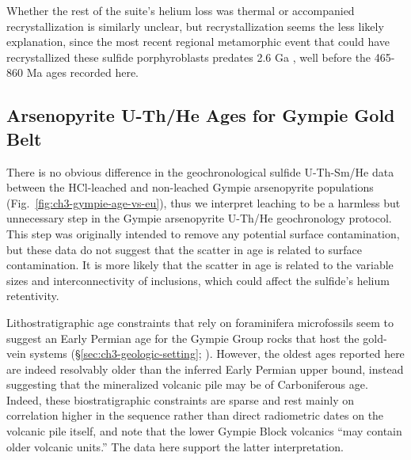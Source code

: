 Whether the rest of the suite's helium loss was
thermal or accompanied recrystallization is similarly unclear, but
recrystallization seems the less likely explanation, since the most
recent regional metamorphic event that could have recrystallized these
sulfide porphyroblasts predates 2.6 Ga \citep{smith1993,hannington1999}, well before the 465-860 Ma ages recorded here.

\subsection{Arsenopyrite U-Th/He Ages for Gympie Gold Belt}

There is no obvious difference in the geochronological sulfide U-Th-Sm/He data between the HCl-leached and non-leached Gympie arsenopyrite populations (Fig.~\ref{fig:ch3-gympie-age-vs-eu}),
thus we interpret leaching to be a harmless but unnecessary step in the Gympie arsenopyrite U-Th/He geochronology protocol. 
This step was originally intended to remove any potential surface contamination, but these data do not suggest that the scatter in age is related to 
surface contamination. It is more likely that the scatter in age is related to the variable sizes and interconnectivity of inclusions, which could affect the sulfide's helium retentivity.

Lithostratigraphic age constraints that rely on foraminifera microfossils
seem to suggest an Early Permian age for the Gympie Group rocks that host the
gold-vein systems (\S\ref{sec:ch3-geologic-setting}; \citealp{holcombe1997}). However, the oldest ages reported here are indeed resolvably older than the inferred 
Early Permian upper bound, instead suggesting that the mineralized volcanic pile may be of Carboniferous age.
Indeed, these biostratigraphic constraints are sparse and rest mainly on
correlation higher in the sequence rather than direct radiometric dates
on the volcanic pile itself, and \citet{holcombe1997} note that the lower
Gympie Block volcanics ``may contain older volcanic units.'' The data here support the latter interpretation.

